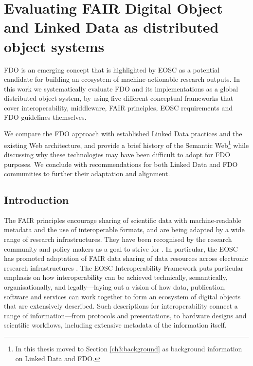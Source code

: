 \section{Evaluating FAIR Digital Object and Linked Data as distributed object systems}\label{ch3:evaluating-fdo-ld}

\acrfull{FDO}
is an emerging concept that is highlighted by 
\acrfull{EOSC}
as a potential candidate for building an ecosystem of machine-actionable research outputs. In this work we systematically evaluate FDO and its implementations as a global distributed object system, by using five different conceptual frameworks that cover interoperability, middleware, FAIR principles, EOSC requirements and FDO guidelines themselves.

We compare the FDO approach with established Linked Data practices and the existing Web architecture, and provide a brief history of the Semantic Web\footnote{
  In this thesis moved to Section \vref{ch3:background} as background information on Linked Data and FDO.} while discussing why these technologies may have been difficult to adopt for FDO purposes. We conclude with recommendations for both Linked Data and FDO communities to further their adaptation and alignment.

\subsection{Introduction}\label{ch3:introduction}

The \acrshort{FAIR} principles \cite{Wilkinson 2016} encourage sharing of scientific data with machine-readable metadata and the use of interoperable formats, and are being adapted by a wide range of research infrastructures. They have been recognised by the research community and policy makers as a goal to strive for \cite{EU 2016}. In particular, the 
\acrlong{EOSC}
has promoted adaptation of FAIR data sharing of data resources across electronic research infrastructures \cite{Mons 2017}. The EOSC Interoperability Framework \cite{Kurowski 2021} puts particular emphasis on how interoperability can be achieved technically, semantically, organisationally, and legally---laying out a vision of how data, publication, software and services can work together to form an ecosystem of digital objects that are extensively described. Such descriptions for interoperability connect a range of information---from protocols and presentations, to hardware designs and scientific workflows, including extensive metadata of the information itself.

